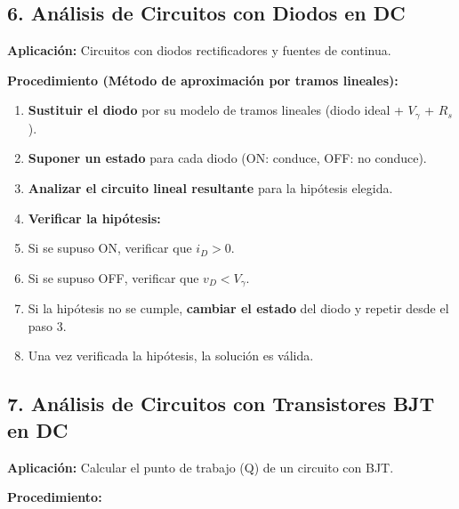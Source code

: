 \documentclass[11pt,a4paper]{article}
\begin{document}
\subsection*{6. Análisis de Circuitos con Diodos en DC}


\textbf{Aplicación:} Circuitos con diodos rectificadores y fuentes de continua.


\textbf{Procedimiento (Método de aproximación por tramos lineales):}


\begin{enumerate}[leftmargin=*,topsep=2pt,itemsep=1pt]
  \item \textbf{Sustituir el diodo} por su modelo de tramos lineales (diodo ideal + $V_\gamma$ + $R_s$).
  \item \textbf{Suponer un estado} para cada diodo (ON: conduce, OFF: no conduce).
  \item \textbf{Analizar el circuito lineal resultante} para la hipótesis elegida.
  \item \textbf{Verificar la hipótesis:}
  \item Si se supuso ON, verificar que $i_D > 0$.
  \item Si se supuso OFF, verificar que $v_D < V_\gamma$.
  \item Si la hipótesis no se cumple, \textbf{cambiar el estado} del diodo y repetir desde el paso 3.
  \item Una vez verificada la hipótesis, la solución es válida.
\end{enumerate}


\subsection*{7. Análisis de Circuitos con Transistores BJT en DC}


\textbf{Aplicación:} Calcular el punto de trabajo (Q) de un circuito con BJT.


\textbf{Procedimiento:}
\end{document}
